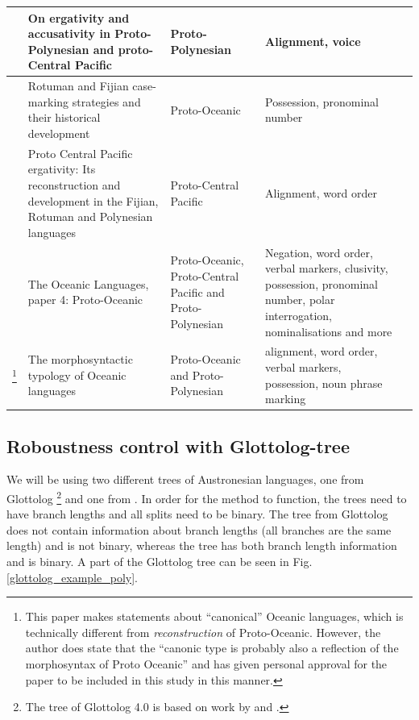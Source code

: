 \documentclass[draft,10pt]{article} %
\begin{document}
\begin{longtable}{|p{3cm}|  p{5cm}| p{4cm} | p{3cm}  | p{3cm} |}
\citet{ball2007ergativity} & On ergativity and accusativity in Proto-Polynesian and proto-Central Pacific&Proto-Polynesian & Alignment, voice \\ \hline

\citet{kikusawa2001rotuman} & Rotuman and Fijian case-marking strategies and their historical development  & Proto-Oceanic & Possession, pronominal number \\ \hline

\citet{kikusawa2002proto}  & Proto Central Pacific ergativity: Its reconstruction and development in the Fijian, Rotuman and Polynesian languages & Proto-Central Pacific   & Alignment, word order \\ \hline

\citet{lynchrosscrowley_proto_grammar_oceanic} & The Oceanic Languages, paper 4: Proto-Oceanic & Proto-Oceanic, Proto-Central Pacific and Proto-Polynesian & Negation, word order, verbal markers, clusivity, possession, pronominal number, polar interrogation, nominalisations and more \\ \hline

\citet{ross2004morphosyntactic}\footnote{This paper makes statements about ``canonical'' Oceanic languages, which is technically different from \emph{reconstruction} of Proto-Oceanic. However, the author does state that the ``canonic type is probably also a reflection of the morphosyntax of Proto Oceanic'' \citep[492]{ross2004morphosyntactic} and has given personal approval for the paper to be included in this study in this manner.}  & The morphosyntactic typology of Oceanic languages &  Proto-Oceanic and Proto-Polynesian  & alignment, word order, verbal markers, possession, noun phrase marking \\ \hline
\end{longtable}



\subsection{Roboustness control with Glottolog-tree}


We will be using two different trees of Austronesian languages, one from Glottolog \citep{glottolog40}\footnote{The tree of Glottolog 4.0 is based on work by \citet{blust_2009, blust_2014} and \citet{blust_chen_2017}.} and one from \citet{grayetal_2009}. In order for the method to function, the trees need to have branch lengths and all splits need to be binary. The tree from Glottolog does not contain information about branch lengths (all branches are the same length) and is not binary, whereas the \citet{grayetal_2009} tree has both branch length information and is binary. A part of the Glottolog tree can be seen in Fig. \ref{glottolog_example_poly}.
\end{document}
